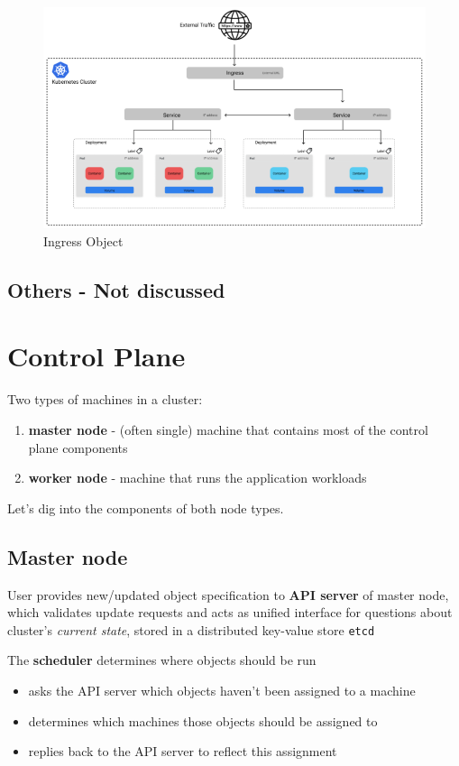 \begin{figure}[htbp]
   \centering
   \includegraphics{images/K8s_ingress.png}
   \caption{Ingress Object}
   \label{fig:K8s_ingress}
\end{figure}

\subsection*{Others - Not discussed}

\section{Control Plane}
Two types of machines in a cluster:
\begin{enumerate}
   \item \textbf{master node} - (often single) machine that contains most of the control plane components
   \item \textbf{worker node} - machine that runs the application workloads
\end{enumerate}

Let's dig into the components of both node types.

\subsection{Master node}

User provides new/updated object specification to \textbf{API server} of master node, 
which
validates update requests and acts as unified interface for questions about cluster's \textit{current state},
stored in a distributed key-value store \texttt{etcd}


The \textbf{scheduler} determines where objects should be run
\begin{itemize}
   \item asks the API server which objects haven't been assigned to a machine
   \item determines which machines those objects should be assigned to
   \item replies back to the API server to reflect this assignment
\end{itemize}

